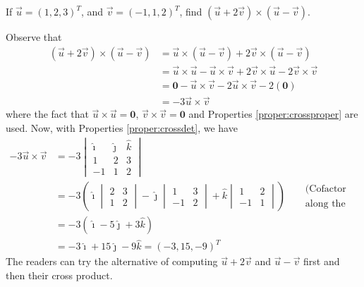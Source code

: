 \begin{exmp}
If $\vec{u} = (1,2,3)^T$, and $\vec{v} = (-1,1,2)^T$, find $(\vec{u} + 2\vec{v}) \times (\vec{u} - \vec{v})$.
\end{exmp}
\begin{solution}
Observe that
\begin{align*}
(\vec{u} + 2\vec{v}) \times (\vec{u} - \vec{v}) &= \vec{u} \times (\vec{u} - \vec{v}) + 2\vec{v} \times (\vec{u} - \vec{v}) \\
&= \vec{u} \times \vec{u} - \vec{u} \times \vec{v} + 2\vec{v} \times \vec{u} - 2\vec{v} \times \vec{v} \\
&= \textbf{0} - \vec{u} \times \vec{v} - 2\vec{u} \times \vec{v} - 2(\textbf{0}) \\
&= -3\vec{u} \times \vec{v}
\end{align*}
where the fact that $\vec{u} \times \vec{u} = \textbf{0}$, $\vec{v} \times \vec{v} = \textbf{0}$ and Properties \ref{proper:crossproper} are used. Now, with Properties \ref{proper:crossdet}, we have
\begin{align*}
-3\vec{u} \times \vec{v} &=  
-3
\begin{vmatrix}
\hat{\imath} & \hat{\jmath} & \hat{k} \\
1 & 2 & 3 \\
-1 & 1 & 2
\end{vmatrix} \\
&= -3\left(\hat{\imath}
\begin{vmatrix}
2 & 3 \\
1 & 2 
\end{vmatrix}
- \hat{\jmath}
\begin{vmatrix}
1 & 3 \\
-1 & 2
\end{vmatrix}
+ \hat{k}
\begin{vmatrix}
1 & 2 \\
-1 & 1 
\end{vmatrix}\right) & \begin{aligned}
&\text{(Cofactor expansion} \\ 
&\text{along the first row)}
\end{aligned} \\
&= -3(\hat{\imath}-5\hat{\jmath}+3\hat{k}) \\
&= -3\hat{\imath}+15\hat{\jmath}-9\hat{k} = (-3,15,-9)^T
\end{align*}
The readers can try the alternative of computing $\vec{u}+2\vec{v}$ and $\vec{u} - \vec{v}$ first and then their cross product.
\end{solution}

